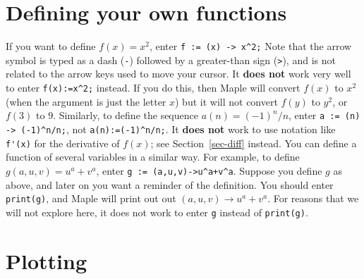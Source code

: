 \documentclass{amsart}
\begin{document}
\section{Defining your own functions}\label{sec-funcdef}
\setcounter{notecounter}{0}


\begin{itemize}
%
  If you want to define $f(x)=x^2$, enter
   \verb~f := (x) -> x^2;~  Note that the arrow symbol is
   typed as a dash (\verb~-~) followed by a greater-than
   sign (\verb~>~), and is not related to the arrow keys
   used to move your cursor.  
%
  It \textbf{does not} work very well to enter
   \verb~f(x):=x^2;~ instead.  If you do this, then Maple
   will convert $f(x)$ to $x^2$ (when the argument is just
   the letter $x$) but it will not convert $f(y)$ to $y^2$,
   or $f(3)$ to $9$. 
%
  Similarly, to define the sequence $a(n)=(-1)^n/n$, enter
  \verb~a := (n) -> (-1)^n/n;~, not \verb~a(n):=(-1)^n/n;~. 
%
  It \textbf{does not} work to use notation like
   \verb~f'(x)~ for the derivative of $f(x)$; see
   Section~\ref{sec-diff} instead. 
%
  You can define a function of several variables in a similar
  way.  For example, to define $g(a,u,v)=u^a+v^a$, enter
  \verb~g := (a,u,v)->u^a+v^a~. 
%
  Suppose you define $g$ as above, and later on you want a
  reminder of the definition.  You should enter
  \verb~print(g)~, and Maple will print out out
  $(a,u,v)\rightarrow u^a+v^a$.  For reasons that we will not
  explore here, it does not work to enter \verb~g~ instead
  of \verb~print(g)~. 
\end{itemize}

\section{Plotting}
\setcounter{notecounter}{0}
\end{document}
